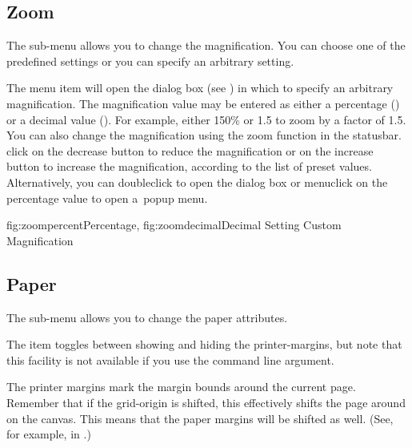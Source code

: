 \subsection{Zoom}\label{sec:zoommenu}


The  sub-menu allows you to change
the magnification. You can choose one of the predefined
settings or you can specify an arbitrary setting.


The  menu item will open the
 dialog box (see ) in
which to specify an arbitrary magnification.  The magnification
value may be entered as either a percentage
() or a decimal value
(). For example, either 150\% or 1.5 to
zoom by a factor of 1.5.  You can also change the magnification
using the zoom function in the \gls{statusbar}. \Gls{click} on the
decrease button  to reduce the magnification or
on the increase button  to increase the
magnification, according to the list of preset values.
Alternatively, you can \gls{doubleclick} to open the 
dialog box or \gls{menuclick} on the percentage value to open
a~popup menu.

 {
   {fig:zoompercent}{}{Percentage},
   {fig:zoomdecimal}{}{Decimal}
 }
 {Setting Custom Magnification}

\subsection{Paper}\label{sec:papermenu}


The  sub-menu allows you to change
the \gls{paper} attributes.


The  item toggles between showing
and hiding the \glspl{printer-margin}, but note that this facility is not
available if you use the  command line
argument.

The printer margins mark the margin bounds around the current page.
Remember that if the \gls{grid-origin} is shifted, this effectively
shifts the page around on the \gls{canvas}. This means that the
paper margins will be shifted as well. (See, for example,
 in
.)

